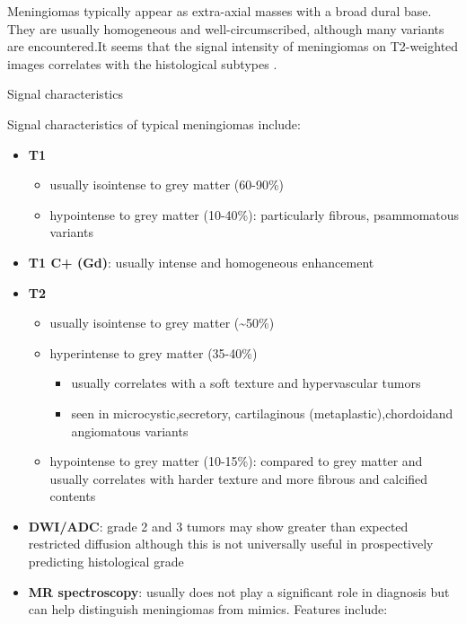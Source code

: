 Meningiomas typically appear as extra-axial masses with a broad dural base. They are usually homogeneous and well-circumscribed, although many variants are encountered.It seems that the signal intensity of meningiomas on T2-weighted images correlates with the histological subtypes .

Signal characteristics

Signal characteristics of typical meningiomas include:

\begin{itemize}
	\item
	\textbf{T1}
	
	\begin{itemize}
		\item
		usually isointense to grey matter (60-90\%)
		\item
		hypointense to grey matter (10-40\%): particularly fibrous, psammomatous variants
	\end{itemize}
	\item
	\textbf{T1 C+ (Gd)}: usually intense and homogeneous enhancement
	\item
	\textbf{T2}
	
	\begin{itemize}
		\item
		usually isointense to grey matter (\textasciitilde50\%)
		\item
		hyperintense to grey matter (35-40\%)
		
		\begin{itemize}
			\item
			usually correlates with a soft texture and hypervascular tumors 
			\item
			seen in microcystic,secretory, cartilaginous (metaplastic),chordoidand angiomatous variants 
		\end{itemize}
		\item
		hypointense to grey matter (10-15\%): compared to grey matter and usually correlates with harder texture and more fibrous and calcified contents
	\end{itemize}
	\item
	\textbf{DWI/ADC}: grade 2 and 3 tumors may show greater than expected restricted diffusion although this is not universally useful in prospectively predicting histological grade 
	\item
	\textbf{MR spectroscopy}: \textbf{} usually does not play a significant role in diagnosis but can help distinguish meningiomas from mimics. Features include:
	

\end{itemize}

